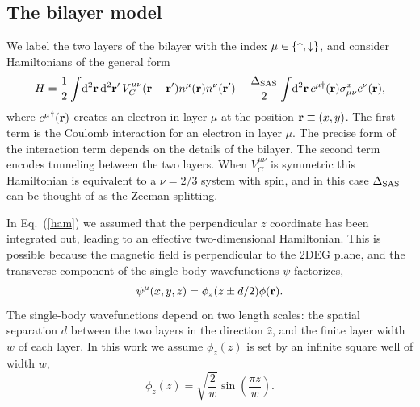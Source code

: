 
\subsection{The bilayer model}
We label the two layers of the bilayer with the index $\mu \in \{\uparrow,\downarrow\}$, and consider  Hamiltonians of the general form
\begin{equation}
	H=\frac{1}{2} \int\! \mathrm{d}^2{\mathbf{r}}\, \mathrm{d}^2{\mathbf{r}}^\prime\, V_C^{\mu\nu}({\mathbf{r}}-{\mathbf{r}}^\prime) n^{\mu}({\mathbf{r}})n^{\nu}({\mathbf{r}}^\prime) 
	- \frac{\Delta_\textrm{SAS}}{2} \int\! \mathrm{d}^2{\mathbf{r}}\, c^{\mu\dagger}({\mathbf{r}}) \sigma^x_{\mu \nu} c^{\nu}({\mathbf{r}}), 
	\label{ham}
\end{equation}
where ${c^{\mu}}^\dagger ({\mathbf{r}})$ creates an electron in layer $\mu$ at the position ${\mathbf{r}}\equiv(x,y)$. The first term is the Coulomb interaction
for an electron in layer $\mu$. The precise form of the interaction term depends on the details of the bilayer. The second term encodes tunneling between the two layers.
When $V_C^{\mu\nu}$ is  symmetric this Hamiltonian is equivalent to a $\nu=2/3$ system with spin, and in this case $\Delta_\textrm{SAS}$ can be thought of as the Zeeman splitting.


In Eq.~(\ref{ham}) we assumed that the perpendicular $z$ coordinate has been integrated out, leading to an effective two-dimensional Hamiltonian.
This is possible because the magnetic field is perpendicular to the 2DEG plane, and the transverse component of the single body wavefunctions $\psi$ factorizes,
\begin{equation}
\psi^\mu(x,y,z)=\phi_z(z \pm d / 2)  \phi({\mathbf{r}}).
\end{equation}
The single-body wavefunctions depend on two length scales: the spatial separation $d$ between the two layers in the direction $\hat{z}$, and the finite layer width $w$ of each layer. In this work we assume $\phi_z(z)$ is set by an infinite square well of width $w$, 
\begin{equation}
\phi_z(z)=\sqrt{\frac{2}{w}} \sin\left(\frac{\pi z}{w}\right). 
\end{equation}
 
